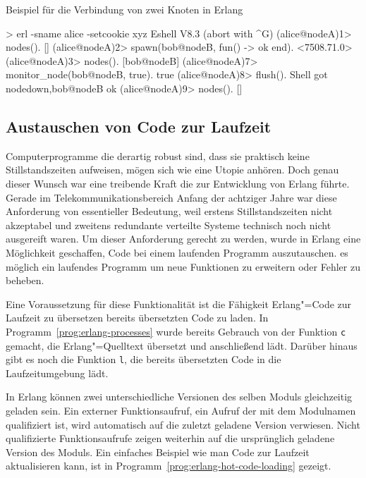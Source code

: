 \begin{program}[!hbt]
\caption{Beispiel für die Verbindung von zwei Knoten in Erlang}
\label{prog:erlang-distributed}
\begin{ErlangCode}
> erl -sname alice -setcookie xyz
Eshell V8.3  (abort with ^G)
(alice@nodeA)1> nodes().
[]
(alice@nodeA)2> spawn(bob@nodeB, fun() -> ok end).
<7508.71.0>
(alice@nodeA)3> nodes().
[bob@nodeB]
(alice@nodeA)7> monitor_node(bob@nodeB, true).
true
(alice@nodeA)8> flush(). %
Shell got {nodedown,bob@nodeB}
ok
(alice@nodeA)9> nodes().
[]
\end{ErlangCode}
\end{program}

\subsection{Austauschen von Code zur Laufzeit}

Computerprogramme die derartig robust sind, dass sie praktisch keine Stillstandszeiten aufweisen, mögen sich wie eine Utopie anhören. Doch genau dieser Wunsch war eine treibende Kraft die zur Entwicklung von Erlang führte. Gerade im Telekommunikationsbereich Anfang der achtziger Jahre war diese Anforderung von essentieller Bedeutung, weil erstens Stillstandszeiten nicht akzeptabel und zweitens redundante verteilte Systeme technisch noch nicht ausgereift waren. Um dieser Anforderung gerecht zu werden, wurde in Erlang eine Möglichkeit geschaffen, Code bei einem laufenden Programm auszutauschen. \Dah es möglich ein laufendes Programm um neue Funktionen zu erweitern oder Fehler zu beheben.

Eine Voraussetzung für diese Funktionalität ist die Fähigkeit Erlang"=Code zur Laufzeit zu übersetzen \bzw bereits übersetzten Code zu laden. In Programm~\ref{prog:erlang-processes} wurde bereits Gebrauch von der Funktion \lstinline{c} gemacht, die Erlang"=Quelltext übersetzt und anschließend lädt. Darüber hinaus gibt es noch die Funktion \lstinline{l}, die bereits übersetzten Code in die Laufzeitumgebung lädt.

In Erlang können zwei unterschiedliche Versionen des selben Moduls gleichzeitig geladen sein. Ein externer Funktionsaufruf, \dah ein Aufruf der mit dem Modulnamen qualifiziert ist, wird automatisch auf die zuletzt geladene Version verwiesen. Nicht qualifizierte Funktionsaufrufe zeigen weiterhin auf die ursprünglich geladene Version des Moduls. Ein einfaches Beispiel wie man Code zur Laufzeit aktualisieren kann, ist in Programm~\ref{prog:erlang-hot-code-loading} gezeigt.

